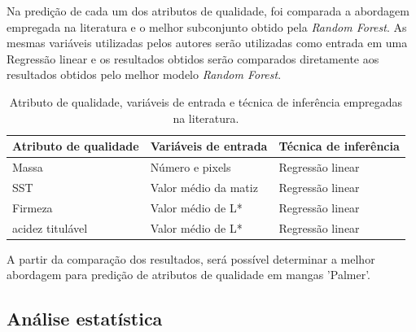 Na predição de cada um dos atributos de qualidade, foi comparada a abordagem empregada na literatura e o melhor subconjunto obtido pela \textit{Random Forest}. As mesmas variáveis utilizadas pelos autores serão utilizadas como entrada em uma Regressão linear e os resultados obtidos serão comparados diretamente aos resultados obtidos pelo melhor modelo \textit{Random Forest}.

\begin{table}[H]
\centering
\caption{Atributo de qualidade, variáveis de entrada e técnica de inferência empregadas na literatura.}\label{tbl:artigos_var}
\begin{tabular}{lll}
\hline
Atributo de qualidade & Variáveis de entrada  & Técnica de inferência \\ \hline
Massa   & Número e pixels & Regressão linear\\ \hline
SST     & Valor médio da matiz & Regressão linear\\ \hline
Firmeza & Valor médio de L* & Regressão linear \\ \hline
acidez titulável  & Valor médio de L* & Regressão linear \\
\hline
\end{tabular}
\end{table}

A partir da comparação dos resultados, será possível determinar a melhor abordagem para predição de atributos de qualidade em mangas 'Palmer'. 

\subsection{Análise estatística}
\label{S:1}
